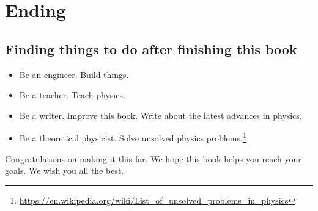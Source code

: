 \chapter{Ending}

\section{Finding things to do after finishing this book}

\begin{itemize}
    \item Be an engineer. Build things.
    \item Be a teacher. Teach physics.
    \item Be a writer. Improve this book. Write about the latest advances in physics.
    \item Be a theoretical physicist. Solve unsolved physics problems.\footnote{\url{https://en.wikipedia.org/wiki/List_of_unsolved_problems_in_physics}}
\end{itemize}

Congratulations on making it this far.
We hope this book helps you reach your goals.
We wish you all the best.
